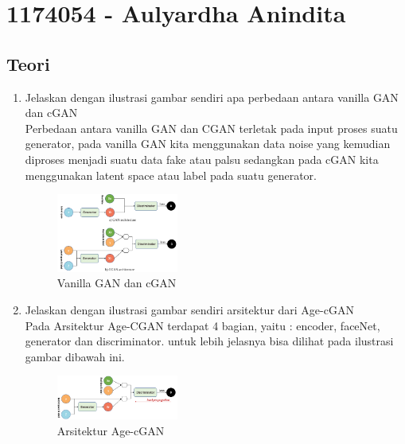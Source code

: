 \section{1174054 - Aulyardha Anindita}

\subsection{Teori}
\begin{enumerate}
\item Jelaskan dengan ilustrasi gambar sendiri apa perbedaan antara vanilla GAN dan cGAN\\
Perbedaan antara vanilla GAN dan CGAN terletak pada input proses suatu generator, pada vanilla GAN kita menggunakan data noise yang kemudian diproses menjadi suatu data fake atau palsu sedangkan pada cGAN kita menggunakan latent space atau label pada suatu generator. 
\begin{figure}[H]
	\includegraphics[width=4cm]{figures/1174054/9/1.png}
	\centering
	\caption{Vanilla GAN dan cGAN}
\end{figure}

\item Jelaskan dengan ilustrasi gambar sendiri arsitektur dari Age-cGAN\\
Pada Arsitektur Age-CGAN terdapat 4 bagian, yaitu : encoder, faceNet, generator dan discriminator.
untuk lebih jelasnya bisa dilihat pada ilustrasi gambar dibawah ini.
\begin{figure}[H]
	\includegraphics[width=4cm]{figures/1174054/9/2.png}
	\centering
	\caption{Arsitektur Age-cGAN}
\end{figure}


\end{enumerate}
